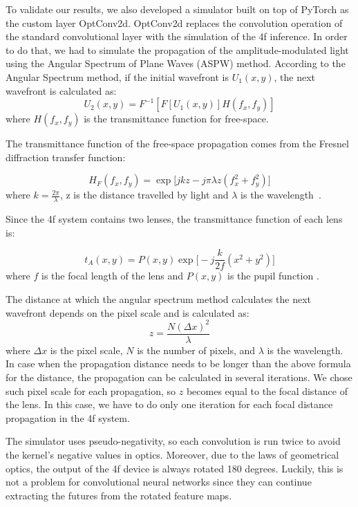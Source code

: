\documentclass{article}
\begin{document}
To validate our results, we also developed a simulator built on top of PyTorch as the custom layer OptConv2d. OptConv2d replaces the convolution operation of the standard convolutional layer with the simulation of the 4f inference. In order to do that, we had to simulate the propagation of the amplitude-modulated light using the Angular Spectrum of Plane Waves (ASPW) method. According to the Angular Spectrum method, if the initial wavefront is $U_1(x,y)$, the next wavefront is calculated as:
\begin{equation}
    U_2(x,y)=F^{-1}[F[U_1(x,y)] H(f_x,f_y)]
\end{equation}
where $H(f_x,f_y)$ is the transmittance function for free-space.

The transmittance function of the free-space propagation comes from the Fresnel diffraction transfer function:

\begin{equation}
    H_{F}(f_x,f_y) = \exp \Biggl[ jkz -j\pi \lambda z(f_x^2+f_y^2)\Biggr]
\end{equation}
where $k=\frac{2\pi}{\lambda}$, z is the distance travelled by light and $\lambda$ is the wavelength~\cite{li_diffraction_2007, voelz_computational_2011}.

Since the 4f system contains two lenses, the transmittance function of each lens is:

\begin{equation}
    t_{A}(x,y) = P(x, y)\exp \Biggl[ -j\frac{k}{2f}(x^2+y^2)\Biggr]
\end{equation}
where $f$ is the focal length of the lens and $P(x,y)$ is the pupil function \cite{voelz_computational_2011}.

The distance at which the angular spectrum method calculates the next wavefront depends on the pixel scale and is calculated as:
\begin{equation}
    z = \frac{N(\Delta x)^2}{\lambda}
\end{equation}
where $\Delta x$ is the pixel scale, $N$ is the number of pixels, and $\lambda$ is the wavelength. In case when the propagation distance needs to be longer than the above formula for the distance, the propagation can be calculated in several iterations. We chose such pixel scale for each propagation, so $z$ becomes equal to the focal distance of the lens. In this case, we have to do only one iteration for each focal distance propagation in the 4f system. 

The simulator uses pseudo-negativity, so each convolution is run twice to avoid the kernel's negative values in optics. Moreover, due to the laws of geometrical optics, the output of the 4f device is always rotated 180 degrees. Luckily, this is not a problem for convolutional neural networks since they can continue extracting the futures from the rotated feature maps. 
\end{document}
